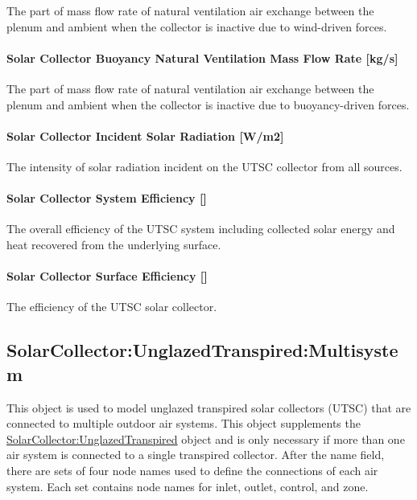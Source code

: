 The part of mass flow rate of natural ventilation air exchange between the plenum and ambient when the collector is inactive due to wind-driven forces.

\paragraph{Solar Collector Buoyancy Natural Ventilation Mass Flow Rate {[}kg/s{]}}\label{solar-collector-buoyancy-natural-ventilation-mass-flow-rate-kgs}

The part of mass flow rate of natural ventilation air exchange between the plenum and ambient when the collector is inactive due to buoyancy-driven forces.

\paragraph{Solar Collector Incident Solar Radiation {[}W/m2{]}}\label{solar-collector-incident-solar-radiation-wm2}

The intensity of solar radiation incident on the UTSC collector from all sources.

\paragraph{Solar Collector System Efficiency {[]}}\label{solar-collector-system-efficiency}

The overall efficiency of the UTSC system including collected solar energy and heat recovered from the underlying surface.

\paragraph{Solar Collector Surface Efficiency {[]}}\label{solar-collector-surface-efficiency}

The efficiency of the UTSC solar collector.

\subsection{SolarCollector:UnglazedTranspired:Multisystem}\label{solarcollectorunglazedtranspiredmultisystem}

This object is used to model unglazed transpired solar collectors (UTSC) that are connected to multiple outdoor air systems. This object supplements the \hyperref[solarcollectorunglazedtranspired]{SolarCollector:UnglazedTranspired} object and is only necessary if more than one air system is connected to a single transpired collector. After the name field, there are sets of four node names used to define the connections of each air system. Each set contains node names for inlet, outlet, control, and zone.

